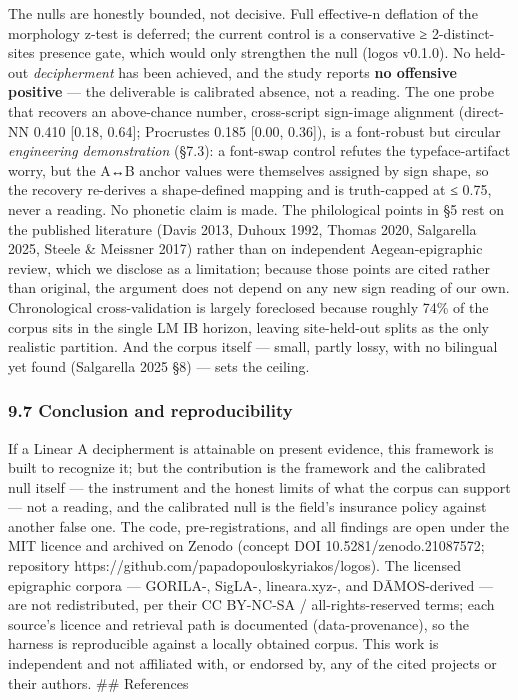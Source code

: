 \documentclass[
  10pt,
]{article}
\begin{document}
The nulls are honestly bounded, not decisive. Full effective-n deflation
of the morphology z-test is deferred; the current control is a
conservative ≥ 2-distinct-sites presence gate, which would only
strengthen the null (logos v0.1.0). No held-out \emph{decipherment} has
been achieved, and the study reports \textbf{no offensive positive} ---
the deliverable is calibrated absence, not a reading. The one probe that
recovers an above-chance number, cross-script sign-image alignment
(direct-NN 0.410 {[}0.18, 0.64{]}; Procrustes 0.185 {[}0.00, 0.36{]}),
is a font-robust but circular \emph{engineering demonstration} (§7.3): a
font-swap control refutes the typeface-artifact worry, but the A↔B
anchor values were themselves assigned by sign shape, so the recovery
re-derives a shape-defined mapping and is truth-capped at ≤ 0.75, never
a reading. No phonetic claim is made. The philological points in §5 rest
on the published literature (Davis 2013, Duhoux 1992, Thomas 2020,
Salgarella 2025, Steele \& Meissner 2017) rather than on independent
Aegean-epigraphic review, which we disclose as a limitation; because
those points are cited rather than original, the argument does not
depend on any new sign reading of our own. Chronological
cross-validation is largely foreclosed because roughly 74\% of the
corpus sits in the single LM IB horizon, leaving site-held-out splits as
the only realistic partition. And the corpus itself --- small, partly
lossy, with no bilingual yet found (Salgarella 2025 §8) --- sets the
ceiling.

\hypertarget{conclusion-and-reproducibility}{%
\subsubsection{9.7 Conclusion and
reproducibility}\label{conclusion-and-reproducibility}}

If a Linear A decipherment is attainable on present evidence, this
framework is built to recognize it; but the contribution is the
framework and the calibrated null itself --- the instrument and the
honest limits of what the corpus can support --- not a reading, and the
calibrated null is the field's insurance policy against another false
one. The code, pre-registrations, and all findings are open under the
MIT licence and archived on Zenodo (concept DOI 10.5281/zenodo.21087572;
repository https://github.com/papadopouloskyriakos/logos). The licensed
epigraphic corpora --- GORILA-, SigLA-, lineara.xyz-, and DĀMOS-derived
--- are not redistributed, per their CC BY-NC-SA / all-rights-reserved
terms; each source's licence and retrieval path is documented
(data-provenance), so the harness is reproducible against a locally
obtained corpus. This work is independent and not affiliated with, or
endorsed by, any of the cited projects or their authors. \#\# References
\end{document}
